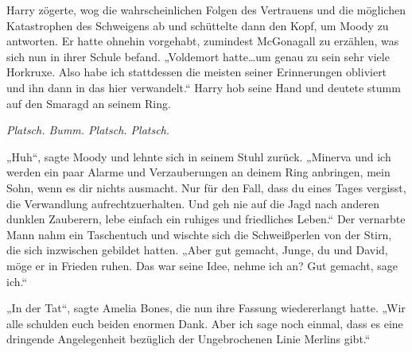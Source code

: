 Harry zögerte, wog die wahrscheinlichen Folgen des Vertrauens und die möglichen Katastrophen des Schweigens ab und schüttelte dann den Kopf, um Moody zu antworten. Er hatte ohnehin vorgehabt, zumindest McGonagall zu erzählen, was sich nun in ihrer Schule befand.
„Voldemort hatte…um genau zu sein sehr viele Horkruxe. Also habe ich stattdessen die meisten seiner Erinnerungen obliviert und ihn dann in das hier verwandelt.“
Harry hob seine Hand und deutete stumm auf den Smaragd an seinem Ring.

\emph{Platsch. Bumm. Platsch. Platsch.}

„Huh“, sagte Moody und lehnte sich in seinem Stuhl zurück. „Minerva und ich werden ein paar Alarme und Verzauberungen an deinem Ring anbringen, mein Sohn, wenn es dir nichts ausmacht. Nur für den Fall, dass du eines Tages vergisst, die Verwandlung aufrechtzuerhalten. Und geh nie auf die Jagd nach anderen dunklen Zauberern, lebe einfach ein ruhiges und friedliches Leben.“
Der vernarbte Mann nahm ein Taschentuch und wischte sich die Schweißperlen von der Stirn, die sich inzwischen gebildet hatten.
„Aber gut gemacht, Junge, du und David, möge er in Frieden ruhen. Das war seine Idee, nehme ich an? Gut gemacht, sage ich.“

„In der Tat“, sagte Amelia Bones, die nun ihre Fassung wiedererlangt hatte.
„Wir alle schulden euch beiden enormen Dank. Aber ich sage noch einmal, dass es eine dringende Angelegenheit bezüglich der Ungebrochenen Linie Merlins gibt.“

